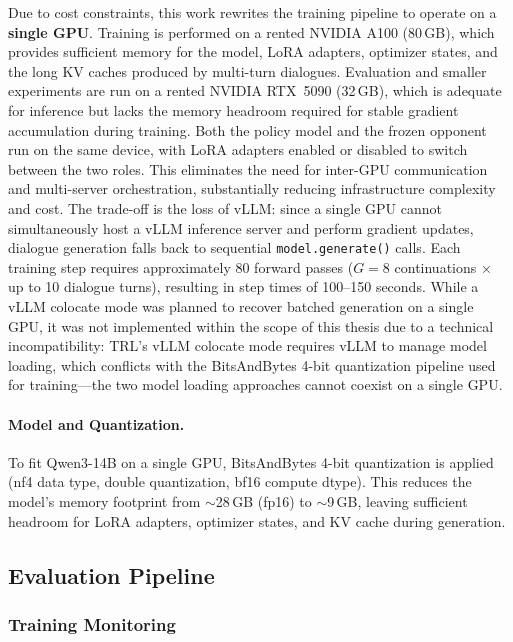 \documentclass[12pt,a4paper]{article}
\begin{document}
Due to cost constraints, this work rewrites the training pipeline to operate on a \textbf{single GPU}. Training is performed on a rented NVIDIA A100 (80\,GB), which provides sufficient memory for the model, LoRA adapters, optimizer states, and the long KV caches produced by multi-turn dialogues. Evaluation and smaller experiments are run on a rented NVIDIA RTX~5090 (32\,GB), which is adequate for inference but lacks the memory headroom required for stable gradient accumulation during training. Both the policy model and the frozen opponent run on the same device, with LoRA adapters enabled or disabled to switch between the two roles. This eliminates the need for inter-GPU communication and multi-server orchestration, substantially reducing infrastructure complexity and cost. The trade-off is the loss of vLLM: since a single GPU cannot simultaneously host a vLLM inference server and perform gradient updates, dialogue generation falls back to sequential \texttt{model.generate()} calls. Each training step requires approximately 80 forward passes ($G = 8$ continuations $\times$ up to 10 dialogue turns), resulting in step times of 100--150 seconds. While a vLLM colocate mode was planned to recover batched generation on a single GPU, it was not implemented within the scope of this thesis due to a technical incompatibility: TRL's vLLM colocate mode requires vLLM to manage model loading, which conflicts with the BitsAndBytes 4-bit quantization pipeline used for training---the two model loading approaches cannot coexist on a single GPU.

\paragraph{Model and Quantization.}
To fit Qwen3-14B on a single GPU, BitsAndBytes 4-bit quantization is applied (nf4 data type, double quantization, bf16 compute dtype). This reduces the model's memory footprint from $\sim$28\,GB (fp16) to $\sim$9\,GB, leaving sufficient headroom for LoRA adapters, optimizer states, and KV cache during generation.


\subsection{Evaluation Pipeline}

\subsubsection{Training Monitoring}
\end{document}
